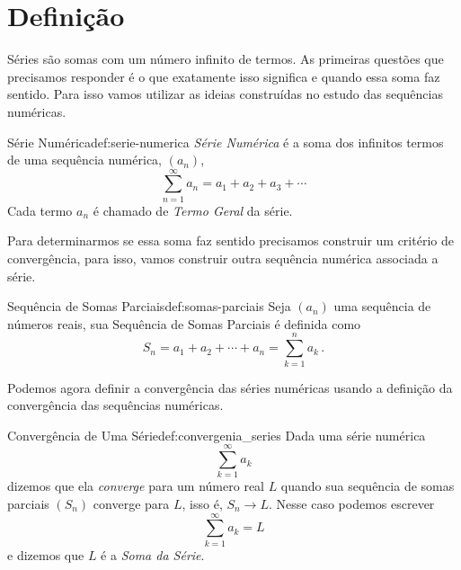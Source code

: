 \section{Definição}

Séries são somas com um número infinito de termos. As primeiras questões que
precisamos responder é o que exatamente isso significa e quando essa soma faz
sentido. Para isso vamos utilizar as ideias construídas no estudo das
sequências numéricas.

\begin{definicao}{Série Numérica}{def:serie-numerica}
  \emph{Série Numérica}
  é a soma dos infinitos termos de uma sequência numérica, $(a_n)$,
  \[
  	\sum_{n=1}^\infty a_n = a_1 + a_2 + a_3 + \cdots
 	\]
  Cada termo $a_n$ é chamado de \emph{Termo Geral} da série.
\end{definicao}

Para determinarmos se essa soma faz sentido precisamos construir um critério de convergência,
para isso, vamos construir outra sequência numérica associada a série.

\begin{definicao}{Sequência de Somas Parciais}{def:somas-parciais}
  Seja $(a_n)$ uma sequência de números reais, sua
  Sequência de Somas Parciais
  é definida como
  \[
    S_n = a_1 + a_2 + \cdots + a_n = \sum_{k=1}^n a_k   \,.
  \]
\end{definicao}

Podemos agora definir a convergência das séries numéricas usando a definição da convergência
das sequências numéricas.

\begin{definicao}{Convergência de Uma Série}{def:convergenia_series}
  Dada uma série numérica
  \[
    \sum_{k=1}^\infty a_k
  \]
  dizemos que ela \emph{converge} para um número real $L$
  quando sua sequência de somas parciais $(S_n)$ converge para $L$, isso é, \(S_n\to L\).
  Nesse caso podemos escrever
  \[
    \sum_{k=1}^\infty a_k = L
  \]
  e dizemos que $L$ é a \emph{Soma da Série}.
\end{definicao}

